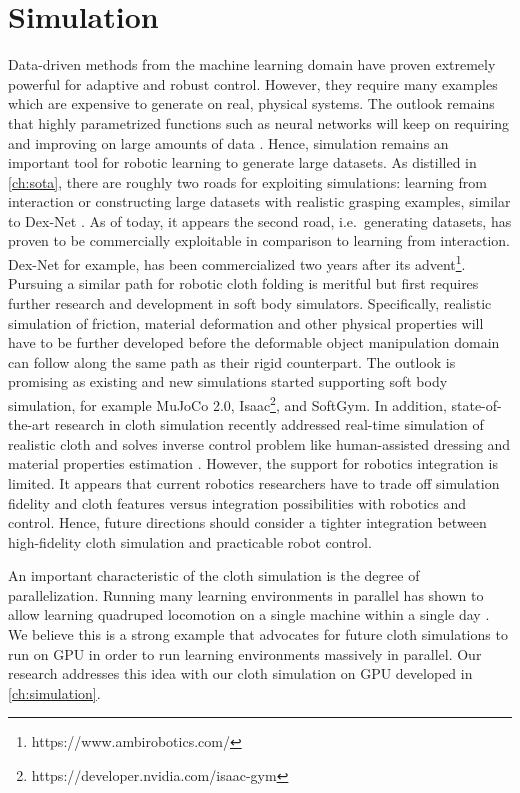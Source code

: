 \documentclass[\home/main.tex]{subfiles}
\begin{document}
\section{Simulation} \label{sec:towards_sim}
Data-driven methods from the machine learning domain have proven extremely powerful for adaptive and robust control. However, they require many examples which are expensive to generate on real, physical systems. The outlook remains that highly parametrized functions such as neural networks will keep on requiring and improving on large amounts of data \autocite{sun2017revisiting}. Hence, simulation remains an important tool for robotic learning to generate large datasets. As distilled in \cref{ch:sota}, there are roughly two roads for exploiting simulations: learning from interaction or constructing large datasets with realistic grasping examples, similar to Dex-Net \autocite{dexnet2}. As of today, it appears the second road, i.e.\ generating datasets, has proven to be commercially exploitable in comparison to learning from interaction. Dex-Net for example, has been commercialized two years after its advent\footnote{https://www.ambirobotics.com/}. Pursuing a similar path for robotic cloth folding is meritful but first requires further research and development in soft body simulators. Specifically,
realistic simulation of friction, material deformation and other physical properties will have to be further developed before the deformable object manipulation domain can follow along the same path as their rigid counterpart. The outlook is promising as  existing and new simulations started supporting soft body simulation, for example MuJoCo 2.0, Isaac\footnote{https://developer.nvidia.com/isaac-gym}, and SoftGym. In addition, state-of-the-art research in cloth simulation recently addressed real-time simulation of realistic cloth and solves inverse control problem like human-assisted dressing and material properties estimation \autocite{Junbang2019,li2021diffcloth}. However, the support for robotics integration is limited. It appears that current robotics researchers have to trade off simulation fidelity and cloth features versus integration possibilities with robotics and control. Hence, future directions should consider a tighter integration between high-fidelity cloth simulation and practicable robot control.

An important characteristic of the cloth simulation is the degree of parallelization. Running many learning environments in parallel has shown to allow learning quadruped locomotion on a single machine within a single day \autocite{rudin2021learning}. We believe this is a strong example that advocates for future cloth simulations to run on GPU in order to run learning environments massively in parallel. Our research addresses this idea with our cloth simulation on \gls{GPU} developed in \cref{ch:simulation}.    
\end{document}
